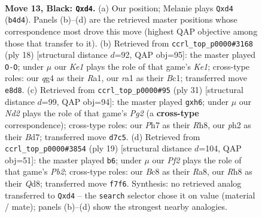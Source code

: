 \documentclass[11pt]{article}
\begin{document}
\clearpage

\begin{figure}[p]\centering
\begin{subfigure}{0.46\textwidth}\centering
\resizebox{\linewidth}{!}{%
\newchessgame
\chessboard[
  setfen={r1b1k2r/pp1nbppp/2n1p3/3pP3/1q1P2Q1/3B1PP1/P2N3P/R1B1K1NR b KQ - 1 13},
  showmover=false,
  pgfstyle=straightmove, color=movearrow, markmove={b4-d4}
]}
\caption{}
\end{subfigure}\hfill
\begin{subfigure}{0.46\textwidth}\centering
\resizebox{\linewidth}{!}{%
\newchessgame
\chessboard[
  setfen={r1b1k1nr/1p3ppp/p1n1p3/q1bpP3/8/P1N2NP1/1P3PBP/R1BQK2R w KQkq - 2 10},
  showmover=false,
  pgfstyle=straightmove, color=movearrow, markmove={e1-g1}
]}
\caption{}
\end{subfigure}
\\[4pt]
\begin{subfigure}{0.46\textwidth}\centering
\resizebox{\linewidth}{!}{%
\newchessgame
\chessboard[
  setfen={r3k2r/1p1bbppp/p1npp2P/q5P1/P3P3/1PN1BP2/1P1Q4/R3KB1R b KQkq - 0 16},
  showmover=false,
  pgfstyle=straightmove, color=movearrow, markmove={g7-h6}
]}
\caption{}
\end{subfigure}\hfill
\begin{subfigure}{0.46\textwidth}\centering
\resizebox{\linewidth}{!}{%
\newchessgame
\chessboard[
  setfen={rn1qkb1r/pp1n1ppp/2p1b3/2Pp4/Q2P1BP1/2N2P2/PP5P/R3KBNR b KQkq - 2 10},
  showmover=false,
  pgfstyle=straightmove, color=movearrow, markmove={b7-b6}
]}
\caption{}
\end{subfigure}
\caption{\textbf{Move 13, Black: \texttt{Qxd4}.} (a) Our position; Melanie plays \texttt{Qxd4} (\texttt{b4d4}). Panels (b)--(d) are the retrieved master positions whose correspondence most drove this move (highest QAP objective among those that transfer to it). (b) Retrieved from \texttt{ccrl\_top\_p0000\#3168} (ply 18) [structural distance $d$=92, QAP obj=95]: the master played \texttt{O-O}; under $\mu$ our \emph{Ke1} plays the role of that game's \emph{Ke1}; cross-type roles: our \emph{q}g4 as their \emph{R}a1, our \emph{r}a1 as their \emph{B}c1; transferred move \texttt{e8d8}. (c) Retrieved from \texttt{ccrl\_top\_p0000\#95} (ply 31) [structural distance $d$=99, QAP obj=94]: the master played \texttt{gxh6}; under $\mu$ our \emph{Nd2} plays the role of that game's \emph{Pg2} (a \textbf{cross-type} correspondence); cross-type roles: our \emph{P}h7 as their \emph{R}h8, our \emph{p}h2 as their \emph{B}d7; transferred move \texttt{d7c5}. (d) Retrieved from \texttt{ccrl\_top\_p0000\#3854} (ply 19) [structural distance $d$=104, QAP obj=51]: the master played \texttt{b6}; under $\mu$ our \emph{Pf2} plays the role of that game's \emph{Pb2}; cross-type roles: our \emph{B}c8 as their \emph{R}a8, our \emph{R}h8 as their \emph{Q}d8; transferred move \texttt{f7f6}. Synthesis: no retrieved analog transferred to \texttt{Qxd4} -- the \texttt{search} selector chose it on value (material / mate); panels (b)--(d) show the strongest nearby analogies.}
\label{fig:thought-m25}
\end{figure}
\end{document}
